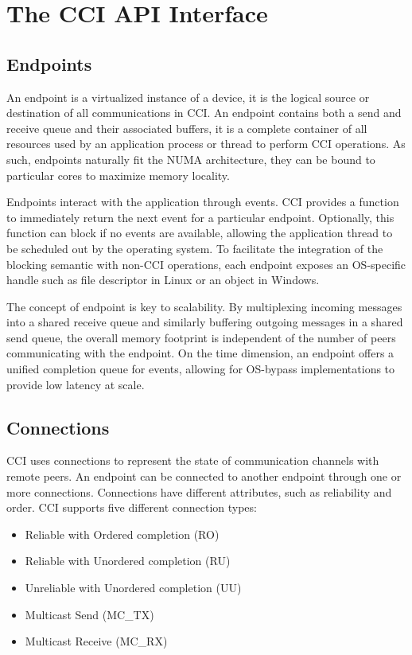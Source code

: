 \section{The CCI API Interface}
\label{sec:interface}

\subsection{Endpoints}
An endpoint is a virtualized instance of a device, it is the logical source 
or destination of all communications in CCI. An endpoint contains both a send 
and receive queue and their associated buffers, it is a complete container 
of all resources used by an application process or thread to perform CCI 
operations. As such, endpoints naturally fit the NUMA architecture, they can 
be bound to particular cores to maximize memory locality.

Endpoints interact with the application through events. CCI provides a 
function to immediately return the next event for a particular endpoint. 
Optionally, this function can block if no events are available, allowing the 
application thread to be scheduled out by the operating system. To facilitate 
the integration of the blocking semantic with non-CCI operations, each endpoint 
exposes an OS-specific handle such as file descriptor in Linux or an object in 
Windows.

The concept of endpoint is key to scalability. By multiplexing incoming 
messages into a shared receive queue and similarly buffering outgoing 
messages in a shared send queue, the overall memory footprint is independent 
of the number of peers communicating with the endpoint. On the time dimension, 
an endpoint offers a unified completion queue for events, allowing for 
OS-bypass implementations to provide low latency at scale.

\subsection{Connections}
CCI uses connections to represent the state of communication channels with 
remote peers. An endpoint can be connected to another endpoint through one or 
more connections. Connections have different attributes, such as 
reliability and order. CCI supports five different connection types:

\begin{itemize}
\item Reliable with Ordered completion (RO)
\item Reliable with Unordered completion (RU)
\item Unreliable with Unordered completion (UU)
\item Multicast Send (MC\_TX)
\item Multicast Receive (MC\_RX)
\end{itemize}

